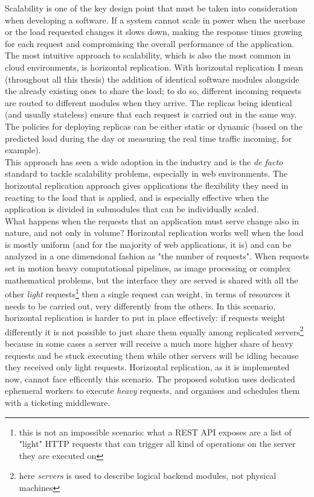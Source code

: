 Scalability is one of the key design point that must be taken into consideration when developing a software. If a system cannot scale in power when the userbase or the load requested changes it slows down, making the response times growing for each request and compromising the overall performance of the application. The most intuitive approach to scalability, which is also the most common in cloud environments, is horizontal replication. With horizontal replication I mean (throughout all this thesis) the addition of identical software modules alongside the already existing ones to share the load; to do so, different incoming requests are routed to different modules when they arrive. The replicas being identical (and usually stateless) ensure that each request is carried out in the same way. The policies for deploying replicas can be either static or dynamic (based on the predicted load during the day or measuring the real time traffic incoming, for example).\\

This approach has seen a wide adoption in the industry and is the \textit{de facto} standard to tackle scalability problems, especially in web environments. The horizontal replication approach gives applications the flexibility they need in reacting to the load that is applied, and is especially effective when the application is divided in submodules that can be individually scaled.\\

What happens when the requests that an application must serve change also in nature, and not only in volume? Horizontal replication works well when the load is mostly uniform (and for the majority of web applications, it is) and can be analyzed in a one dimensional fashion as "the number of requests". When requests set in motion heavy computational pipelines, as image processing or complex mathematical problems, but the interface they are served is shared with all the other \textit{light} requests\footnote{this is not an impossible scenario: what a REST API exposes are a list of "light" HTTP requests that can trigger all kind of operations on the server they are executed on} then a single request can weight, in terms of resources it needs to be carried out, very differently from the others. In this scenario, horizontal replication is harder to put in place effectively: if requests weight differently it is not possible to just share them equally among replicated servers\footnote{here \textit{servers} is used to describe logical backend modules, not physical machines} because in some cases a server will receive a much more higher share of heavy requests and be stuck executing them while other servers will be idling because they received only light requests. Horizontal replication, as it is implemented now, cannot face efficently this scenario. The proposed solution uses dedicated ephemeral workers to execute \textit{heavy} requests, and organises and schedules them with a ticketing middleware. 
